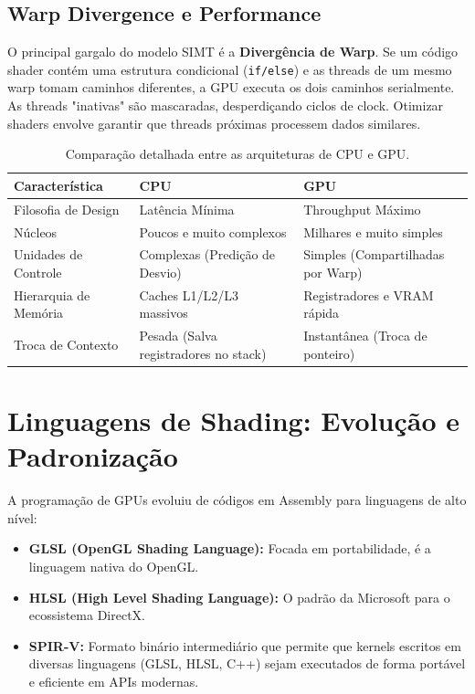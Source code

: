 \subsection{Warp Divergence e Performance}

O principal gargalo do modelo SIMT é a \textbf{Divergência de Warp}. Se um código shader contém uma estrutura condicional (\texttt{if/else}) e as threads de um mesmo warp tomam caminhos diferentes, a GPU executa os dois caminhos serialmente. As threads "inativas" são mascaradas, desperdiçando ciclos de clock. Otimizar shaders envolve garantir que threads próximas processem dados similares.

\begin{table}[h]
\centering
\begin{tabular}{|l|l|l|}
\hline
\textbf{Característica} & \textbf{CPU} & \textbf{GPU} \\ \hline
Filosofia de Design & Latência Mínima & Throughput Máximo \\ \hline
Núcleos & Poucos e muito complexos & Milhares e muito simples \\ \hline
Unidades de Controle & Complexas (Predição de Desvio) & Simples (Compartilhadas por Warp) \\ \hline
Hierarquia de Memória & Caches L1/L2/L3 massivos & Registradores e VRAM rápida \\ \hline
Troca de Contexto & Pesada (Salva registradores no stack) & Instantânea (Troca de ponteiro) \\ \hline
\end{tabular}
\caption{Comparação detalhada entre as arquiteturas de CPU e GPU.}
\end{table}

\section{Linguagens de Shading: Evolução e Padronização}

A programação de GPUs evoluiu de códigos em Assembly para linguagens de alto nível:
\begin{itemize}
    \item \textbf{GLSL (OpenGL Shading Language):} Focada em portabilidade, é a linguagem nativa do OpenGL.
    \item \textbf{HLSL (High Level Shading Language):} O padrão da Microsoft para o ecossistema DirectX.
    \item \textbf{SPIR-V:} Formato binário intermediário que permite que kernels escritos em diversas linguagens (GLSL, HLSL, C++) sejam executados de forma portável e eficiente em APIs modernas.
\end{itemize}

